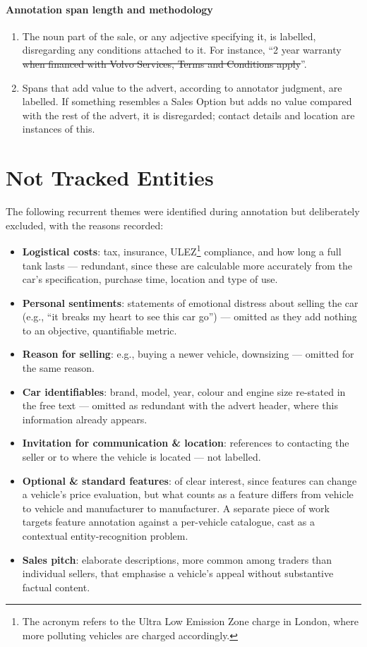 \documentclass[11pt,a4paper]{article}
\begin{document}
\paragraph{Annotation span length and methodology}
\begin{enumerate}
\item The noun part of the sale, or any adjective specifying it, is labelled, disregarding any
conditions attached to it. For instance, ``2 year warranty \sout{when financed with Volvo
Services, Terms and Conditions apply}''.
\item Spans that add value to the advert, according to annotator judgment, are labelled. If
something resembles a Sales Option but adds no value compared with the rest of the advert, it is
disregarded; contact details and location are instances of this.
\end{enumerate}

\section*{Not Tracked Entities}
The following recurrent themes were identified during annotation but deliberately excluded, with
the reasons recorded:
\begin{itemize}
    \item \textbf{Logistical costs}: tax, insurance, ULEZ\footnote{The acronym refers to the
    Ultra Low Emission Zone charge in London, where more polluting vehicles are charged
    accordingly.} compliance, and how long a full tank lasts --- redundant, since these are
    calculable more accurately from the car's specification, purchase time, location and type
    of use.
    \item \textbf{Personal sentiments}: statements of emotional distress about selling the car
    (e.g., ``it breaks my heart to see this car go'') --- omitted as they add nothing to an
    objective, quantifiable metric.
    \item \textbf{Reason for selling}: e.g., buying a newer vehicle, downsizing --- omitted for
    the same reason.
    \item \textbf{Car identifiables}: brand, model, year, colour and engine size re-stated in
    the free text --- omitted as redundant with the advert header, where this information
    already appears.
    \item \textbf{Invitation for communication \& location}: references to contacting the
    seller or to where the vehicle is located --- not labelled.
    \item \textbf{Optional \& standard features}: of clear interest, since features can change a
    vehicle's price evaluation, but what counts as a feature differs from vehicle to vehicle and
    manufacturer to manufacturer. A separate piece of work targets feature annotation against a
    per-vehicle catalogue, cast as a contextual entity-recognition problem.
    \item \textbf{Sales pitch}: elaborate descriptions, more common among traders than
    individual sellers, that emphasise a vehicle's appeal without substantive factual content.
\end{itemize}
\end{document}
